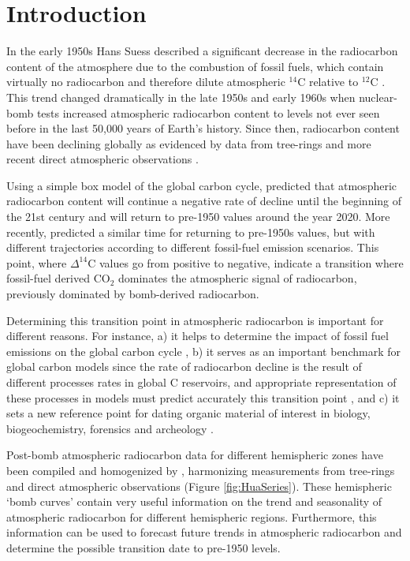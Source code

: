 \documentclass[a4paper, 11pt]{article}
\begin{document}
\section{Introduction}
In the early 1950s Hans Suess described a significant decrease in the radiocarbon content of the atmosphere due to the combustion of fossil fuels, which contain virtually no radiocarbon and therefore dilute atmospheric $^{14}$C relative to $^{12}$C \citep{Suess1953, Suess1955Sci}. This trend changed dramatically in the late 1950s and early 1960s when nuclear-bomb tests increased atmospheric radiocarbon content to levels not ever seen before in the last 50,000 years of Earth's history. Since then, radiocarbon content have been declining globally as evidenced by data from tree-rings and more recent direct atmospheric observations \citep{Tans1979Nature, Manning1990, Levin1989Radiocarbon, Currie2011, Graven2012JGR, Hua2013Radiocarbon, Levin2013Tellus}.

Using a simple box model of the global carbon cycle, \citet{Caldeira1998GRL} predicted that atmospheric radiocarbon content will continue a negative rate of decline until the beginning of the 21st century and will return to pre-1950 values around the year 2020. More recently, \citet{Graven2015PNAS} predicted a similar time for returning to pre-1950s values, but with different trajectories according to different fossil-fuel emission scenarios. This point, where $\Delta^{14}$C values go from positive to negative, indicate a transition where fossil-fuel derived CO$_2$ dominates the atmospheric signal of radiocarbon, previously dominated by bomb-derived radiocarbon. 

Determining this transition point in atmospheric radiocarbon is important for different reasons. For instance, a) it helps to determine the impact of fossil fuel emissions on the global carbon cycle \citep{Caldeira1998GRL, Turnbull2009JGR, Graven2015PNAS}, b) it serves as an important benchmark for global carbon models since the rate of radiocarbon decline is the result of different processes rates in global C reservoirs, and appropriate representation of these processes in models must predict accurately this transition point \citep{Oeschger1975Tellus, Randerson2002GBC, Naegler2006}, and c) it sets a new reference point for dating organic material of interest in biology, biogeochemistry, forensics and archeology \citep{Graven2015PNAS}. 

Post-bomb atmospheric radiocarbon data for different hemispheric zones have been compiled and homogenized  by \cite{Hua2013Radiocarbon}, harmonizing measurements from tree-rings \citep[e.g.][]{Hertelendi1983, Levin1997, Hua2000, Park2002, Yamada2005, Hua2012GRL, Rakowski2013} and direct atmospheric observations \citep[e.g.][]{Vogel1971, Berger1987, Manning1990, Nydal1996, Levin2004, Meijer2006, Turnbull2007, Levin2010Tellus, Currie2011, Graven2012JGR} (Figure \ref{fig:HuaSeries}). These hemispheric `bomb curves' contain very useful information on the trend and seasonality of atmospheric radiocarbon for different hemispheric regions. Furthermore, this information can be used to forecast future trends in atmospheric radiocarbon and determine the possible transition date to pre-1950 levels.
\end{document}
